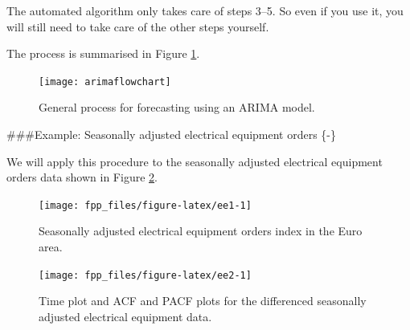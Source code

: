 \documentclass[]{book}
\newenvironment{Shaded}{\begin{snugshade}}{\end{snugshade}}
\newcommand{\DataTypeTok}[1]{\textcolor[rgb]{0.13,0.29,0.53}{#1}}
\newcommand{\KeywordTok}[1]{\textcolor[rgb]{0.13,0.29,0.53}{\textbf{#1}}}
\newcommand{\NormalTok}[1]{#1}
\newcommand{\OperatorTok}[1]{\textcolor[rgb]{0.81,0.36,0.00}{\textbf{#1}}}
\newcommand{\StringTok}[1]{\textcolor[rgb]{0.31,0.60,0.02}{#1}}
\begin{document}
The automated algorithm only takes care of steps 3--5. So even if you use it, you will still need to take care of the other steps yourself.

The process is summarised in Figure \ref{fig:arimaflowchart}.

\begin{figure}

{\centering \texttt{[image: arimaflowchart]} 

}

\caption{General process for forecasting using an ARIMA model.}\label{fig:arimaflowchart}
\end{figure}

\#\#\#Example: Seasonally adjusted electrical equipment orders \{-\}

We will apply this procedure to the seasonally adjusted electrical equipment orders data shown in Figure \ref{fig:ee1}.

\begin{Shaded}
\end{Shaded}

\begin{figure}

{\centering \texttt{[image: fpp\_files/figure-latex/ee1-1]} 

}

\caption{Seasonally adjusted electrical equipment orders index in the Euro area.}\label{fig:ee1}
\end{figure}

\begin{Shaded}
\end{Shaded}

\begin{figure}

{\centering \texttt{[image: fpp\_files/figure-latex/ee2-1]} 

}

\caption{Time plot and ACF and PACF plots for the differenced seasonally adjusted electrical equipment data.}\label{fig:ee2}
\end{figure}
\end{document}
